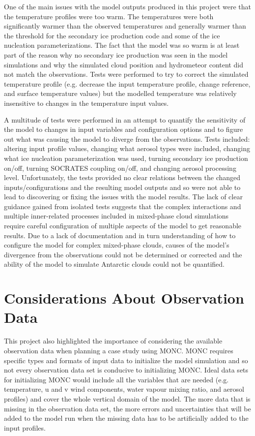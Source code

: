 One of the main issues with the model outputs produced in this project were that the temperature profiles were too warm. The temperatures were both significantly warmer than the observed temperatures and generally warmer than the threshold for the secondary ice production code and some of the ice nucleation parameterizations. The fact that the model was so warm is at least part of the reason why no secondary ice production was seen in the model simulations and why the simulated cloud position and hydrometeor content did not match the observations. Tests were performed to try to correct the simulated temperature profile (e.g. decrease the input temperature profile, change reference, and surface temperature values) but the modelled temperature was relatively insensitive to changes in the temperature input values.

A multitude of tests were performed in an attempt to quantify the sensitivity of the model to changes in input variables and configuration options and to figure out what was causing the model to diverge from the observations. Tests included: altering input profile values, changing what aerosol types were included, changing what ice nucleation parameterization was used, turning secondary ice production on/off, turning SOCRATES coupling on/off, and changing aerosol processing level. Unfortunately, the tests provided no clear relations between the changed inputs/configurations and the resulting model outputs and so were not able to lead to discovering or fixing the issues with the model results. The lack of clear guidance gained from isolated tests suggests that the complex interactions and multiple inner-related processes included in mixed-phase cloud simulations require careful configuration of multiple aspects of the model to get reasonable results. Due to a lack of documentation and in turn understanding of how to configure the model for complex mixed-phase clouds, causes of the model's divergence from the observations could not be determined or corrected and the ability of the model to simulate Antarctic clouds could not be quantified.

\section{Considerations About Observation Data}
This project also highlighted the importance of considering the available observation data when planning a case study using MONC. MONC requires specific types and formats of input data to initialize the model simulation and so not every observation data set is conducive to initializing MONC. Ideal data sets for initializing MONC would include all the variables that are needed (e.g. temperature, u and v wind components, water vapour mixing ratio, and aerosol profiles) and cover the whole vertical domain of the model. The more data that is missing in the observation data set, the more errors and uncertainties that will be added to the model run when the missing data has to be artificially added to the input profiles.

